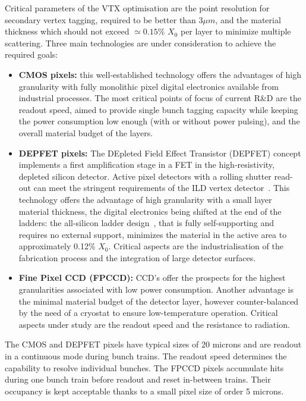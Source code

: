 Critical parameters of the VTX optimisation are the point resolution for secondary vertex tagging, required to be better than 3$\mu m$, and the material thickness which should not exceed $\simeq 0.15\%$ $X_0$ per layer to minimize multiple scattering. Three main technologies are under consideration to achieve the required goals:
\begin{itemize}
    \item {\bf CMOS pixels:} this well-established technology offers the advantages of high granularity with fully monolithic pixel digital electronics available from industrial processes. The most critical points of focus of current R\&D are the readout speed, aimed to provide single bunch tagging capacity while keeping the power consumption low enough (with or without power pulsing), and the overall material budget of the layers.
    \item {\bf DEPFET pixels:} The DEpleted Field Effect Transistor (DEPFET) concept implements a first amplification stage in a FET in the high-resistivity, depleted silicon detector. Active pixel detectors with a rolling shutter read-out can meet the stringent requirements of the ILD vertex detector~\cite{Alonso:2012ss,Richter:2003dn}. This technology offers the advantage of high granularity with a small layer material thickness, the digital electronics being shifted at the end of the ladders: the all-silicon ladder design~\cite{Andricek:2004cj}, that is fully self-supporting and requires no external support, minimizes the material in the active area to approximately 0.12\% $X_{0}$. Critical aspects are the industrialisation of the fabrication process and the integration of large detector surfaces.
    \item{\bf Fine Pixel CCD (FPCCD):} CCD's offer the prospects for the highest granularities associated with low power consumption. Another advantage is the minimal material budget of the detector layer, however counter-balanced by the need of a cryostat to ensure low-temperature operation. Critical aspects under study are the readout speed and the resistance to radiation.  
\end{itemize}

\vspace{0.5cm}
The CMOS and DEPFET pixels have typical sizes of 20 microns and are readout in a continuous mode during bunch trains. The readout speed determines the capability to resolve individual bunches. The FPCCD pixels accumulate hits during one bunch train before readout and reset in-between trains. Their occupancy is kept acceptable thanks to a small pixel size of order 5 microns.  


